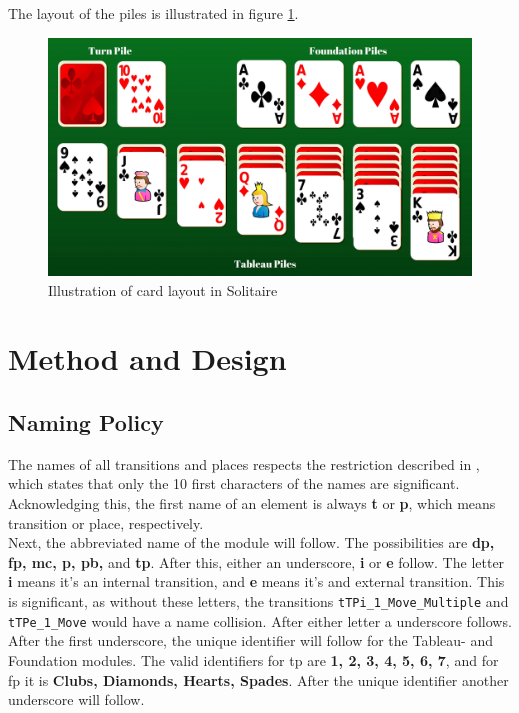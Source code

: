 \documentclass[runningheads,a4paper]{llncs}
\begin{document}
The layout of the piles is illustrated in figure \ref{fig:illuatration_solitaire}.
\begin{figure}
	\includegraphics[trim=150 0 0 0, scale=0.3]{images/TableauPiles}
	\caption{Illustration of card layout in Solitaire}
	\label{fig:illuatration_solitaire}
\end{figure}

\clearpage
\section{Method and Design}
\label{sec:2_method_and_design}
\subsection{Naming Policy}
\label{sec:2_naming_policy}
The names of all transitions and places respects the restriction described in \cite{GPenSIMguide}, which states that only the 10 first characters of the names are significant. Acknowledging this, the first name of an element is always \textbf{t} or \textbf{p}, which means transition or place, respectively. \\

Next, the abbreviated name of the module will follow. The possibilities are \textbf{\ac{dp}, \ac{fp}, \ac{mc}, \ac{p}, \ac{pb},} and \textbf{\ac{tp}}. After this, either an underscore, \textbf{i} or \textbf{e} follow. The letter \textbf{i} means it's an internal transition, and \textbf{e} means it's and external transition. This is significant, as without these letters, the transitions \verb!tTPi_1_Move_Multiple! and \verb!tTPe_1_Move! would have a name collision. After either letter a underscore follows.\\

After the first underscore, the unique identifier will follow for the Tableau- and Foundation modules. The valid identifiers for \ac{tp} are \textbf{1, 2, 3, 4, 5, 6, 7}, and for \ac{fp} it is \textbf{Clubs, Diamonds, Hearts, Spades}. After the unique identifier another underscore will follow.\\
\end{document}

